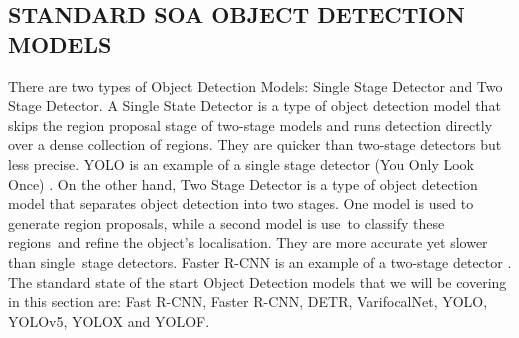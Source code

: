 \documentclass[conference]{IEEEtran}
\begin{document}
\subsection{STANDARD SOA OBJECT DETECTION MODELS}
There are two types of Object Detection Models: Single Stage Detector and Two Stage Detector. A Single State Detector is a type of object detection model that skips the region proposal stage of two-stage models and runs detection directly over a dense collection of regions. They are quicker than two-stage detectors but less precise. YOLO is an example of a single stage detector (You Only Look Once) \cite{DBLP:journals/corr/RedmonDGF15}. On the other hand, Two Stage Detector is a type of object detection model that separates object detection into two stages. One model is used to generate region proposals, while a second model is use to classify these regions and refine the object's localisation. They are more accurate yet slower than single stage detectors. Faster R-CNN is an example of a two-stage detector \cite{1}. The standard state of the start Object Detection models that we will be covering in this section are: Fast R-CNN, Faster R-CNN, DETR, VarifocalNet, YOLO, YOLOv5, YOLOX and YOLOF.

\begin{table}[h]
\centering
{}
\caption{A summary of the mAP acheived by different models on the MS-COCO Dataset.}
\label{tab:my-table1}
\end{table}
\end{document}
